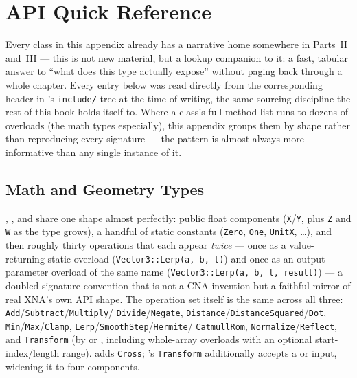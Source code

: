 \chapter{API Quick Reference}
\label{ch:api-quick-reference}

Every class in this appendix already has a narrative home somewhere in Parts~II and~III ---
this is not new material, but a lookup companion to it: a fast, tabular answer to ``what does
this type actually expose'' without paging back through a whole chapter. Every entry below was
read directly from the corresponding header in 's \texttt{include/} tree at the
time of writing, the same sourcing discipline the rest of this book holds itself to. Where a
class's full method list runs to dozens of overloads (the math types especially), this appendix
groups them by shape rather than reproducing every signature --- the pattern is almost always
more informative than any single instance of it.

\section{Math and Geometry Types}
\label{sec:api-math}

, , and  share one shape almost perfectly:
public float components (\texttt{X}/\texttt{Y}, plus \texttt{Z} and \texttt{W} as the type
grows), a handful of static constants (\texttt{Zero}, \texttt{One}, \texttt{UnitX}, \dots), and
then roughly thirty operations that each appear \emph{twice} --- once as a value-returning
static overload (\texttt{Vector3::Lerp(a, b, t)}) and once as an output-parameter overload of
the same name (\texttt{Vector3::Lerp(a, b, t, result)}) --- a doubled-signature convention that
is not a CNA invention but a faithful mirror of real XNA's own API shape. The operation set
itself is the same across all three: \texttt{Add}/\texttt{Subtract}/\texttt{Multiply}/%
\texttt{Divide}/\texttt{Negate}, \texttt{Distance}/\texttt{DistanceSquared}/\texttt{Dot},
\texttt{Min}/\texttt{Max}/\texttt{Clamp}, \texttt{Lerp}/\texttt{SmoothStep}/\texttt{Hermite}/%
\texttt{CatmullRom}, \texttt{Normalize}/\texttt{Reflect}, and \texttt{Transform} (by
 or , including whole-array overloads with an optional
start-index/length range).  adds \texttt{Cross}; 's
\texttt{Transform} additionally accepts a  or  input,
widening it to four components.

